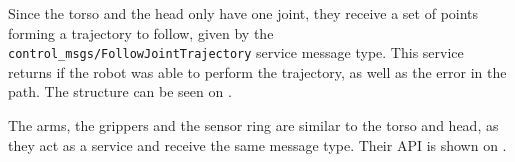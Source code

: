 Since the torso and the head only have one joint, they receive a set of points forming a trajectory to follow, given by the \texttt{control\_msgs/FollowJointTrajectory} service message type. This service returns if the robot was able to perform the trajectory, as well as the error in the path. The structure can be seen on .

\begin{table}[!ht]
\caption{Torso and head command API.} \label{tab:headapi}
\renewcommand*{\arraystretch}{1.1}
\end{table}

The arms, the grippers and the sensor ring are similar to the torso and head, as they act as a service and receive the same message type. Their API is shown on .


